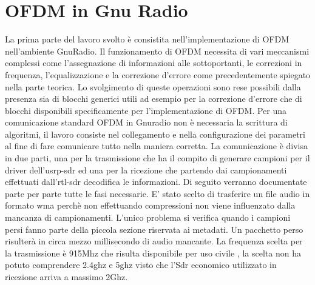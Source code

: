 \chapter{OFDM in Gnu Radio}
\label{cha:789}
La prima parte del lavoro svolto è consistita nell'implementazione di OFDM nell'ambiente GnuRadio. Il funzionamento di OFDM necessita di vari meccanismi complessi come l'assegnazione di informazioni alle sottoportanti, le correzioni in frequenza, l'equalizzazione e la correzione d'errore come precedentemente spiegato nella parte teorica. Lo svolgimento di queste operazioni sono rese possibili dalla presenza sia di blocchi generici utili ad esempio per la correzione d'errore che di blocchi disponibili specificamente per l'implementazione di OFDM. Per una comunicazione standard OFDM in Gnuradio non è necessaria la scrittura di algoritmi, il lavoro consiste nel collegamento e nella configurazione dei parametri al fine di fare comunicare tutto nella maniera corretta.
La comunicazione è divisa in due parti, una per la trasmissione che ha il compito di generare campioni per il driver dell'usrp-sdr ed una per la ricezione che partendo dai campionamenti effettuati dall'rtl-sdr decodifica le informazioni. Di seguito verranno documentate parte per parte tutte le fasi necessarie.
E' stato scelto di trasferire un file audio in formato wma perchè non effettuando compressioni non viene influenzato dalla mancanza di campionamenti. L'unico problema si verifica quando i campioni persi fanno parte della piccola sezione riservata ai metadati. Un pacchetto perso risulterà in circa mezzo millisecondo di audio mancante. La frequenza scelta per la trasmissione è 915Mhz che risulta disponibile per uso civile \cite{frequenze}, la scelta non ha potuto comprendere 2.4ghz e 5ghz visto che l'Sdr economico utilizzato in ricezione arriva a massimo 2Ghz.
